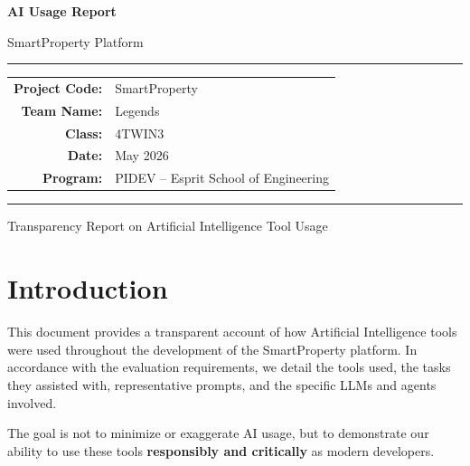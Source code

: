 \documentclass[12pt,a4paper]{article}
\begin{document}
\begin{titlepage}
    \centering
    \vspace*{2cm}
    {\Huge\bfseries\textcolor{primaryblue}{AI Usage Report}\par}
    \vspace{0.5cm}
    {\LARGE\textcolor{primaryblue!70}{SmartProperty Platform}\par}
    \vspace{2cm}
    \rule{\textwidth}{1pt}\par
    \vspace{1cm}
    \begin{tabular}{rl}
        \textbf{Project Code:} & SmartProperty \\[0.3em]
        \textbf{Team Name:}    & Legends \\[0.3em]
        \textbf{Class:}        & 4TWIN3 \\[0.3em]
        \textbf{Date:}         & May 2026 \\[0.3em]
        \textbf{Program:}      & PIDEV -- Esprit School of Engineering \\
    \end{tabular}
    \vspace{1cm}\par
    \rule{\textwidth}{1pt}
    \vfill
    {\large Transparency Report on Artificial Intelligence Tool Usage\par}
    \vspace{1cm}
\end{titlepage}

\tableofcontents
\newpage

\section{Introduction}

This document provides a transparent account of how Artificial Intelligence tools were used throughout the development of the SmartProperty platform. In accordance with the evaluation requirements, we detail the tools used, the tasks they assisted with, representative prompts, and the specific LLMs and agents involved.

The goal is not to minimize or exaggerate AI usage, but to demonstrate our ability to use these tools \textbf{responsibly and critically} as modern developers.
\end{document}
